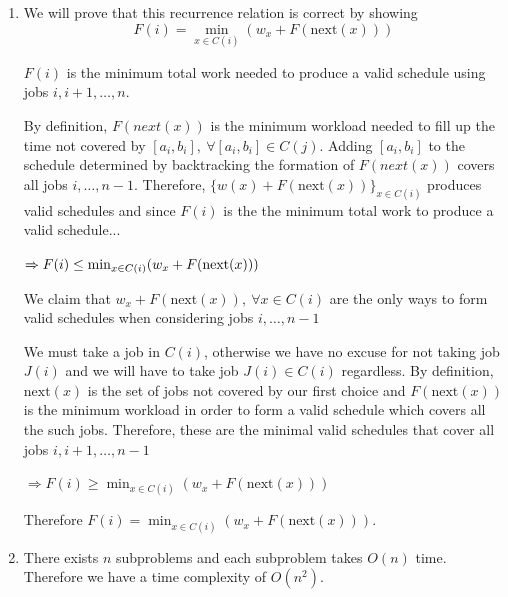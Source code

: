\documentclass[12pt]{article}
\newcounter{subproblem}
\newcommand{\nextline}{\\[0.2em]}
\begin{document}
\begin{enumerate}
\item[(c)] We will prove that this recurrence relation is correct by showing 
\[F(i) = \min_{x \in C(i)} (w_x + F(\text{next}(x)))\]

$F(i)$ is the minimum total work needed to produce a valid schedule using jobs $i,i+1,\dots,n$.

By definition, $F(next(x))$ is the minimum workload needed to fill up the time not covered by $[a_i, b_i], ~\forall [a_i, b_i] \in C(j)$. Adding $[a_i, b_i]$ to the schedule determined by backtracking the formation of $F(next(x))$ covers all jobs $i, \dots, n-1$. Therefore, $\{w(x) + F(\text{next}(x))\}_{x \in C(i)}$ produces valid schedules and since $F(i)$ is the the minimum total work to produce a valid schedule...

$\Rightarrow F(i) \leq \min_{x \in C(i)} (w_x + F(\text{next}(x))) \nextline$


We claim that $w_x + F(\text{next}(x)), ~\forall x \in C(i)$ are the only ways to form valid schedules when considering jobs $i, \dots, n-1$ 

We must take a job in $C(i)$, otherwise we have no excuse for not taking job $J(i)$ and we will have to take job $J(i) \in C(i)$ regardless. By definition, $\text{next}(x)$ is the set of jobs not covered by our first choice and $F(\text{next}(x))$ is the minimum workload in order to form a valid schedule which covers all the such jobs. Therefore, these are the minimal valid schedules that cover all jobs $i, i+1, \dots, n-1$

$\Rightarrow F(i) \geq \min_{x \in C(i)} (w_x + F(\text{next}(x)))$

Therefore $F(i) = \min_{x \in C(i)} (w_x + F(\text{next}(x)))$.

\item[(d)] There exists $n$ subproblems and each subproblem takes $O(n)$ time. Therefore we have a time complexity of $O(n^2)$.
\end{enumerate}
\end{document}
